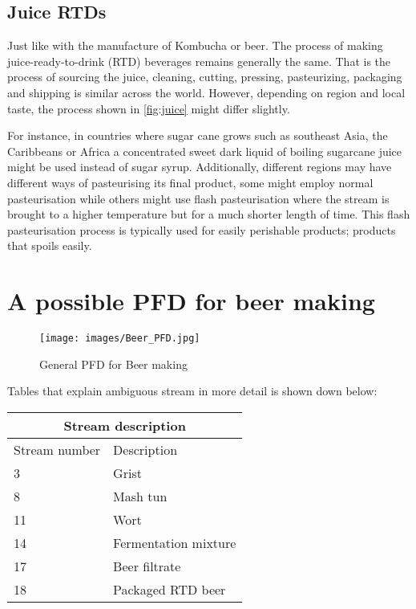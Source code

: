 \subsection{Juice RTDs}
Just like with the manufacture of Kombucha or beer. The process of making juice-ready-to-drink (RTD) beverages remains generally the same. That is the process of sourcing the juice, cleaning, cutting, pressing, pasteurizing, packaging and shipping is similar across the world. However, depending on region and local taste, the process shown in \ref{fig:juice} might differ slightly. \par

\vspace{0.3cm}
For instance, in countries where sugar cane grows such as southeast Asia, the Caribbeans or Africa a concentrated sweet dark liquid of boiling sugarcane juice might be used instead of sugar syrup. Additionally, different regions may have different ways of pasteurising its final product, some might employ normal pasteurisation while others might use flash pasteurisation where the stream is brought to a higher temperature but for a much shorter length of time. This flash pasteurisation process is typically used for easily perishable products; products that spoils easily. 
\pagebreak

\section{A possible PFD for beer making}
\begin{figure}[H]
    \centering
    \texttt{[image: images/Beer\_PFD.jpg]}
    \caption{General PFD for Beer making}
    \label{fig:beer_PFD}
\end{figure}
\pagebreak

Tables that explain ambiguous stream in more detail is shown down below:
\begin{center}
\begin{tabular}{ |p{3cm}||p{3cm}||  }
 \hline
 \multicolumn{2}{|c|}{\textbf{Stream description}} \\
 \hline
Stream number& Description\\
 \hline
3 & Grist\\
8 & Mash tun\\
11& Wort\\
14& Fermentation mixture\\
17& Beer filtrate\\
18& Packaged RTD beer\\
 \hline
\end{tabular}
\end{center}
